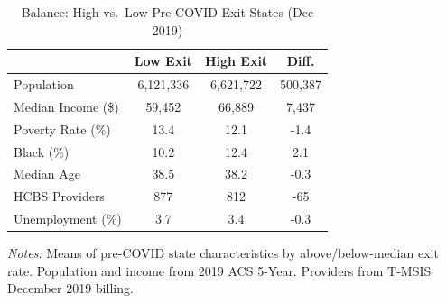 \begin{table}[t]
\centering
\caption{Balance: High vs.\ Low Pre-COVID Exit States (Dec 2019)}
\label{tab:balance}
\begin{tabular}{lccc}
\toprule
 & Low Exit & High Exit & Diff. \\
\midrule
Population & 6,121,336 & 6,621,722 & 500,387 \\
Median Income (\$) & 59,452 & 66,889 & 7,437 \\
Poverty Rate (\%) & 13.4 & 12.1 & -1.4 \\
Black (\%) & 10.2 & 12.4 & 2.1 \\
Median Age & 38.5 & 38.2 & -0.3 \\
HCBS Providers & 877 & 812 & -65 \\
Unemployment (\%) & 3.7 & 3.4 & -0.3 \\
\bottomrule
\end{tabular}
\begin{minipage}{0.85\textwidth}
\vspace{0.2cm}
\footnotesize \textit{Notes:} Means of pre-COVID state characteristics by above/below-median exit rate. Population and income from 2019 ACS 5-Year. Providers from T-MSIS December 2019 billing.
\end{minipage}
\end{table}
